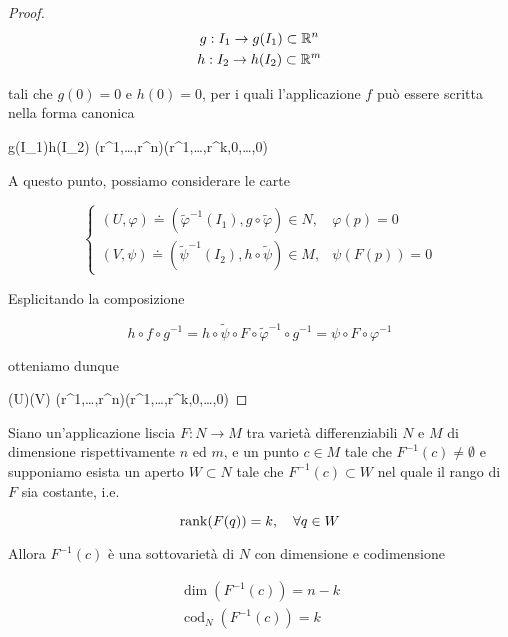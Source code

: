 \begin{proof}
	\begin{gather}
		g : I_{1} \to g(I_{1}) \subset \mathbb{R}^{n} \\
		h : I_{2} \to h(I_{2}) \subset \mathbb{R}^{m}
	\end{gather}

	tali che $ g(0) = 0 $ e $ h(0) = 0 $, per i quali l'applicazione $ f $ può essere scritta nella forma canonica
	
		{g(I_{1})}{h(I_{2})}
		{(r^{1},\dots,r^{n})}{(r^{1},\dots,r^{k},0,\dots,0)}

	A questo punto, possiamo considerare le carte
	
	\begin{equation}
		\begin{cases}
			(U,\varphi) \doteq (\tilde{\varphi}^{-1}(I_{1}), g \circ \tilde{\varphi}) \in N, & \varphi(p) = 0 \\
			(V,\psi) \doteq (\tilde{\psi}^{-1}(I_{2}), h \circ \tilde{\psi}) \in M, & \psi(F(p)) = 0
		\end{cases}
	\end{equation}
	
	Esplicitando la composizione
	
	\begin{equation}
		h \circ f \circ g^{-1} = h \circ \tilde{\psi} \circ F \circ \tilde{\varphi}^{-1} \circ g^{-1} = \psi \circ F \circ \varphi^{-1}
	\end{equation}

	otteniamo dunque
	
		{\varphi(U)}{\psi(V)}
		{(r^{1},\dots,r^{n})}{(r^{1},\dots,r^{k},0,\dots,0)}
\end{proof}

\begin{theorem}\label{thm:preimg-rank}
	Siano un'applicazione liscia $ F : N \to M $ tra varietà differenziabili $ N $ e $ M $ di dimensione rispettivamente $ n $ ed $ m $, e un punto $ c \in M $ tale che $ F^{-1}(c) \neq \emptyset $ e supponiamo esista un aperto $ W \subset N $ tale che $ F^{-1}(c) \subset W $ nel quale il rango di $ F $ sia costante, i.e.
	
	\begin{equation}
		\rank(F(q)) = k \qcomma \forall q \in W
	\end{equation}

	Allora $ F^{-1}(c) $ è una sottovarietà di $ N $ con dimensione e codimensione
	
	\begin{gather}
		\dim(F^{-1}(c)) = n - k \\
		\operatorname{cod}_{N}(F^{-1}(c)) = k
	\end{gather}
\end{theorem}

